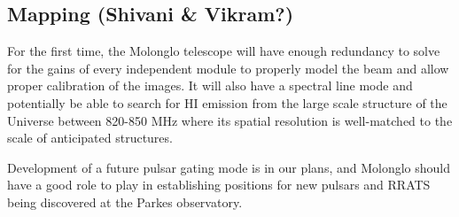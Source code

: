\subsection{Mapping (Shivani & Vikram?)}

For the first time, the Molonglo telescope will have enough redundancy to solve for the gains of every independent module to properly model the beam and allow proper calibration of the images. It will also have a spectral line mode and potentially be able to search for HI emission from the large scale structure of the Universe between 820-850 MHz where its spatial resolution is well-matched to the scale of anticipated structures.

Development of a future pulsar gating mode is in our plans, and Molonglo should have a good role to play in establishing positions for new pulsars and RRATS being discovered at the Parkes observatory.